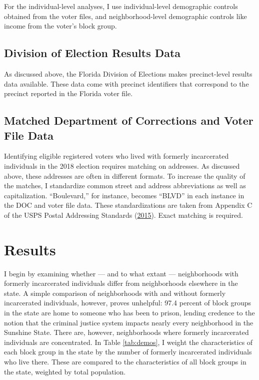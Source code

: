 \documentclass[
  12pt,
]{article}
\begin{document}
For the individual-level analyses, I use individual-level demographic controls obtained from the voter files, and neighborhood-level demographic controls like income from the voter's block group.

\hypertarget{division-of-election-results-data}{%
\subsection*{Division of Election Results Data}\label{division-of-election-results-data}}

As discussed above, the Florida Division of Elections makes precinct-level results data available. These data come with precinct identifiers that correspond to the precinct reported in the Florida voter file.

\hypertarget{matched-department-of-corrections-and-voter-file-data}{%
\subsection*{Matched Department of Corrections and Voter File Data}\label{matched-department-of-corrections-and-voter-file-data}}

Identifying eligible registered voters who lived with formerly incarcerated individuals in the 2018 election requires matching on addresses. As discussed above, these addresses are often in different formats. To increase the quality of the matches, I standardize common street and address abbreviations as well as capitalization. ``Boulevard,'' for instance, becomes ``BLVD'' in each instance in the DOC and voter file data. These standardizations are taken from Appendix C of the USPS Postal Addressing Standards (\protect\hyperlink{ref-USPS2015}{2015}). Exact matching is required.

\hypertarget{results}{%
\section*{Results}\label{results}}

I begin by examining whether --- and to what extant --- neighborhoods with formerly incarcerated individuals differ from neighborhoods elsewhere in the state. A simple comparison of neighborhoods with and without formerly incarcerated individuals, however, proves unhelpful: 97.4 percent of block groups in the state are home to someone who has been to prison, lending credence to the notion that the criminal justice system impacts nearly every neighborhood in the Sunshine State. There are, however, neighborhoods where formerly incarcerated individuals are concentrated. In Table \ref{tab:demos}, I weight the characteristics of each block group in the state by the number of formerly incarcerated individuals who live there. These are compared to the characteristics of all block groups in the state, weighted by total population.
\end{document}
